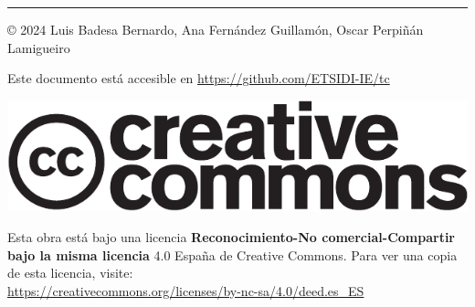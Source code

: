 \vspace*{\fill}

\rule[.5ex]{\linewidth}{1pt} 

© 2024 Luis Badesa Bernardo, Ana Fernández Guillamón, Oscar Perpiñán Lamigueiro

Este documento está accesible en \url{https://github.com/ETSIDI-IE/tc}

\begin{center}
\includegraphics[scale=0.5]{../figs/cc-logo}
\par\end{center}

Esta obra está bajo una licencia \textbf{Reconocimiento-No comercial-Compartir
bajo la misma licencia} 4.0 España de Creative Commons. Para ver una
copia de esta licencia, visite:\\
 \url{https://creativecommons.org/licenses/by-nc-sa/4.0/deed.es_ES}

